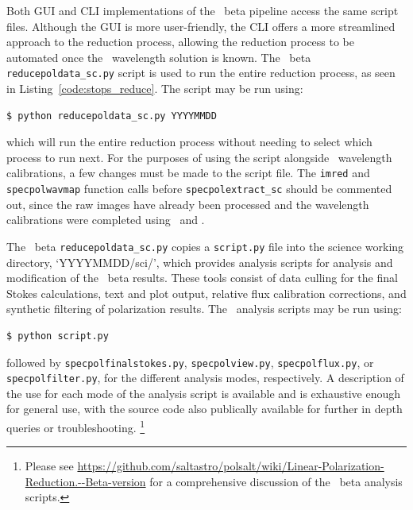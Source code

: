 Both \gls{GUI} and \gls{CLI} implementations of the \polsalt\ beta pipeline access the same script files. Although the \gls{GUI} is more user-friendly, the \gls{CLI} offers a more streamlined approach to the reduction process, allowing the reduction process to be automated once the \iraf\ wavelength solution is known. The \polsalt\ beta \texttt{reducepoldata\_sc.py} script is used to run the entire reduction process, as seen in Listing~\ref{code:stops_reduce}. The script may be run using:
\begin{lstlisting}[language=bash]
$ python reducepoldata_sc.py YYYYMMDD
\end{lstlisting}
{\parskip=0pt which} will run the entire reduction process without needing to select which process to run next. For the purposes of using the script alongside \iraf\ wavelength calibrations, a few changes must be made to the script file. The \texttt{imred} and \texttt{specpolwavmap} function calls before \texttt{specpolextract\_sc} should be commented out, since the raw images have already been processed and the wavelength calibrations were completed using \stops\ and \iraf.

The \polsalt\ beta \texttt{reducepoldata\_sc.py} copies a \texttt{script.py} file into the science working directory, `YYYYMMDD/sci/', which provides analysis scripts for analysis and modification of the \polsalt\ beta results. These tools consist of data culling for the final Stokes calculations, text and plot output, relative flux calibration corrections, and synthetic filtering of polarization results. The \polsalt\ analysis scripts may be run using:
\begin{lstlisting}[language=bash]
$ python script.py
\end{lstlisting}
{\parskip=0pt followed} by \texttt{specpolfinalstokes.py}, \texttt{specpolview.py}, \texttt{specpolflux.py}, or \texttt{specpol\-filter.py}, for the different analysis modes, respectively. A description of the use for each mode of the analysis script is available and is exhaustive enough for general use, with the source code also publically available for further in depth queries or troubleshooting.%
\footnote{Please see \url{https://github.com/saltastro/polsalt/wiki/Linear-Polarization-Reduction.--Beta-version} for a comprehensive discussion of the \polsalt\ beta analysis scripts.}

